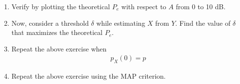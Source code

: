 \documentclass[journal,12pt,twocolumn]{IEEEtran}
\renewcommand\thesection{\arabic{section}}
\begin{document}
\begin{enumerate}[label=\thesection.\arabic*
,ref=\thesection.\theenumi]
\begin{enumerate}[label=\thesection.\arabic*
,ref=\thesection.\theenumi]
\solution
\begin{align}
    P_e=P(X=1)P_{e|0}+P(X=-1)P_{e|1}
\end{align}
Since X is equiprobable
\begin{align}
    P(X=1)=P(X=-1)=0.5\\
    \implies P_e=\frac{P_{e|0}+P_{e|1}}{2}\\
    \implies \boxed{P_e=Q_N(A)}
\end{align}
\item
Verify by plotting  the theoretical $P_e$ with respect to $A$ from 0 to 10 dB.  
%
\item Now, consider a threshold $\delta$  while estimating $X$ from $Y$. Find the value of $\delta$ that maximizes the theoretical $P_e$.
\item Repeat the above exercise when 
	\begin{align}
		p_{X}(0) = p
	\end{align}
\item Repeat the above exercise using the MAP criterion.
		\end{enumerate}

\end{enumerate}
\end{document}

